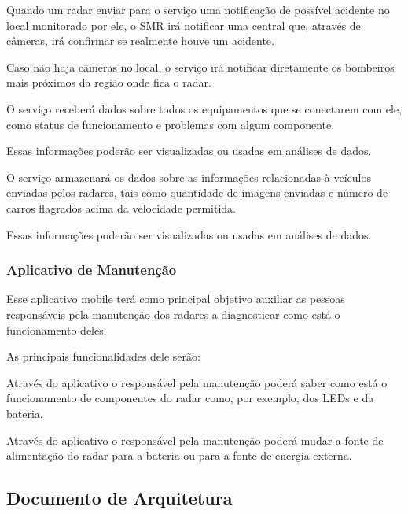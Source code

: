 
Quando um radar enviar para o serviço uma notificação de possível acidente no local monitorado por ele, o SMR irá notificar uma central que, através de câmeras, irá confirmar se realmente houve um acidente.

Caso não haja câmeras no local, o serviço irá notificar diretamente os bombeiros mais próximos da região onde fica o radar.


O serviço receberá dados sobre todos os equipamentos que se conectarem com ele, como status de funcionamento e problemas com algum componente.

Essas informações poderão ser visualizadas ou usadas em análises de dados.


O serviço armazenará os dados sobre as informações relacionadas à veículos enviadas pelos radares, tais como quantidade de imagens enviadas e número de carros flagrados acima da velocidade permitida.

Essas informações poderão ser visualizadas ou usadas em análises de dados.

\subsubsection{Aplicativo de Manutenção}

Esse aplicativo mobile terá como principal objetivo auxiliar as pessoas responsáveis pela manutenção dos radares a diagnosticar como está o funcionamento deles.

As principais funcionalidades dele serão:


Através do aplicativo o responsável pela manutenção poderá saber como está o funcionamento de componentes do radar como, por exemplo, dos LEDs e da bateria.


Através do aplicativo o responsável pela manutenção poderá mudar a fonte de alimentação do radar para a bateria ou para a fonte de energia externa.

\subsection{Documento de Arquitetura}\label{documento-de-arquitetura}

